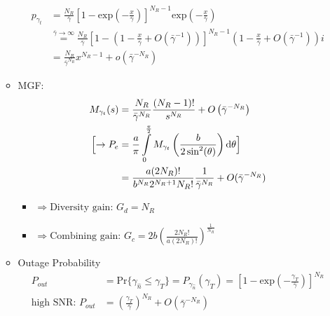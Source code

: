 \documentclass[a4paper, 10pt]{article}
\newcommand{\rom}[1]{$\underline{\overline{\text{#1}}}$}
\begin{document}
\begin{itemize}
\begin{itemize}
			\begin{align*}
			p_{\gamma_t}&=\frac{N_R}{\bar{\gamma}}
			\left[1-\mathrm{exp}\left(-\frac{x}{\bar{\gamma}}\right)\right]^{N_R-1}\mathrm{exp}\left(-\frac{x}{\bar{\gamma}}\right)\\
			&\overset{\bar{\gamma} \rightarrow \infty}{=} \frac{N_R}{\bar{\gamma}}
			\left[1-\left(1-\frac{x}{\bar{\gamma}}+O\left(\bar{\gamma}^{-1}\right)\right)\right]^{N_R-1}
			\left(1-\frac{x}{\bar{\gamma}}+O\left(\bar{\gamma}^{-1}\right)\right)i\\
			&=\frac{N_R}{\bar{\gamma}^{N_R}}x^{N_R-1}+o\left(\bar{\gamma}^{-N_R}\right)
			\end{align*}
		\item MGF:
			\begin{align*}
			M_{\gamma_t}(s)&=\frac{N_R}{\bar{\gamma}^{N_R}}\frac{(N_R-1)!}{s^{N_R}}+O\left(\bar{\gamma}^{-N_R}\right)\\
			\Bigl[\rightarrow P_e&=\frac{a}{\pi}\int\limits^{\frac{\pi}{2}}_0 M_{\gamma_t}\left(\frac{b}{2\sin^2(\theta)}\right)\mathrm{d}\theta\Bigr]\\
			&=\frac{a(2N_R)!}{b^{N_R}2^{N_R+1}N_R!}\frac{1}{\bar{\gamma}^{N_R}}+O(\bar{\gamma}^{-N_R})
			\end{align*}
		\begin{itemize}
			\item[] $\Longrightarrow \text{Diversity gain: } G_d = N_R$
			\item[] $\Longrightarrow \text{Combining gain: } G_c = 2b\left(\frac{2N_R!}{a(2N_R)!}\right)^{\frac{1}{N_R}}$
		\end{itemize}
		\item Outage Probability
		\begin{align*}
			P_{out}&=\mathrm{Pr}\{\gamma_{\hat{n}} \leq \gamma_T \}=P_{\gamma_{\hat{n}}}(\gamma_T)=\left[1-\mathrm{exp}\left(-\frac{\gamma_T}{\bar{\gamma}}\right)\right]^{N_R}\\
			\text{high SNR: } P_{out}&=\left(\frac{\gamma_T}{\bar{\gamma}}\right)^{N_R}+O\left(\bar{\gamma}^{-N_R}\right)
		\end{align*}
		\end{itemize}
	\end{itemize}
\end{document}
